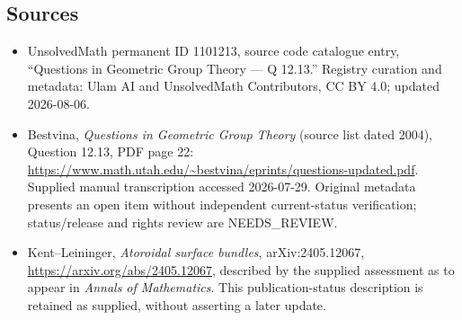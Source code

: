 \documentclass[11pt]{article}
\begin{document}
\subsection{Sources}
\begin{itemize}
\item UnsolvedMath permanent ID 1101213, source code catalogue entry, ``Questions in Geometric Group Theory --- Q 12.13.'' Registry curation and metadata: Ulam AI and UnsolvedMath Contributors, CC BY 4.0; updated 2026-08-06.
\item Bestvina, \emph{Questions in Geometric Group Theory} (source list dated 2004), Question 12.13, PDF page 22: \url{https://www.math.utah.edu/~bestvina/eprints/questions-updated.pdf}. Supplied manual transcription accessed 2026-07-29. Original metadata presents an open item without independent current-status verification; status/release and rights review are NEEDS\_REVIEW.
\item Kent--Leininger, \emph{Atoroidal surface bundles}, arXiv:2405.12067, \url{https://arxiv.org/abs/2405.12067}, described by the supplied assessment as to appear in \emph{Annals of Mathematics}. This publication-status description is retained as supplied, without asserting a later update.
\end{itemize}
\end{document}

